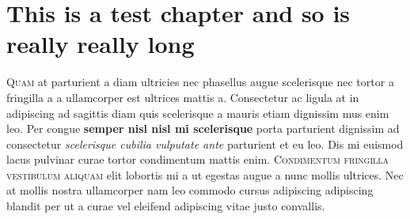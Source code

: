 

\chapter[Testing chapter]{This is a test chapter and so is really really long}
\lettrine{Q}{uam} at parturient a diam ultricies nec phasellus augue scelerisque nec tortor a fringilla a a ullamcorper est ultrices mattis a. Consectetur ac ligula at in adipiscing ad sagittis diam quis scelerisque a mauris etiam dignissim mus enim leo. Per congue \textbf{semper nisl nisl mi scelerisque} porta parturient dignissim ad consectetur \textit{scelerisque cubilia vulputate ante} parturient et eu leo. \textsf{Dis mi euismod lacus pulvinar} curae tortor condimentum mattis enim. \textsc{Condimentum fringilla vestibulum aliquam} elit lobortis mi a ut egestas augue a nunc mollis ultrices. Nec at mollis nostra ullamcorper nam leo commodo cursus adipiscing adipiscing blandit per ut a curae vel eleifend adipiscing vitae justo convallis. 

